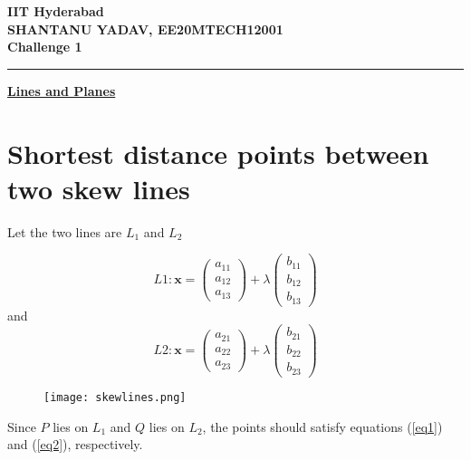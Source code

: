 \documentclass[12pt]{article}
\begin{document}
\begin{center}
	{\Large \bf IIT Hyderabad} \\ \vspace{2ex}
	{\large \bf SHANTANU YADAV, EE20MTECH12001 }\\
	\vspace{2ex}
	{\large \bf Challenge 1} \\
\end{center}
	\hrule

\vspace{2ex}
\begin{center}
{\underline{\Large \bf Lines and Planes}}
\end{center}

\section*{Shortest distance points between two skew lines}
	Let the two lines are $L_1$ and $L_2$

\begin{equation}
	L1 : \mathbf{x} = 
\begin{pmatrix}
	a_{11} \\
	a_{12} \\
	a_{13}
\end{pmatrix}
	+ \lambda
\begin{pmatrix}
	b_{11} \\
	b_{12} \\
	b_{13}
\end{pmatrix}
	\label{eq1}
\end{equation}
and
\begin{equation}
	L2 : \mathbf{x} = 
\begin{pmatrix}
	a_{21} \\
	a_{22} \\
	a_{23}
\end{pmatrix}
	+ \lambda
\begin{pmatrix}
	b_{21} \\
	b_{22} \\
	b_{23}
\end{pmatrix}
	\label{eq2}
\end{equation}


\begin{figure}[htbp]
	\centering
\texttt{[image: skewlines.png]}
\end{figure}
\noindent
Since $P$ lies on $L_1$ and $Q$ lies on $L_2$, the points should satisfy 
	equations (\ref{eq1}) and (\ref{eq2}), respectively.
\end{document}
